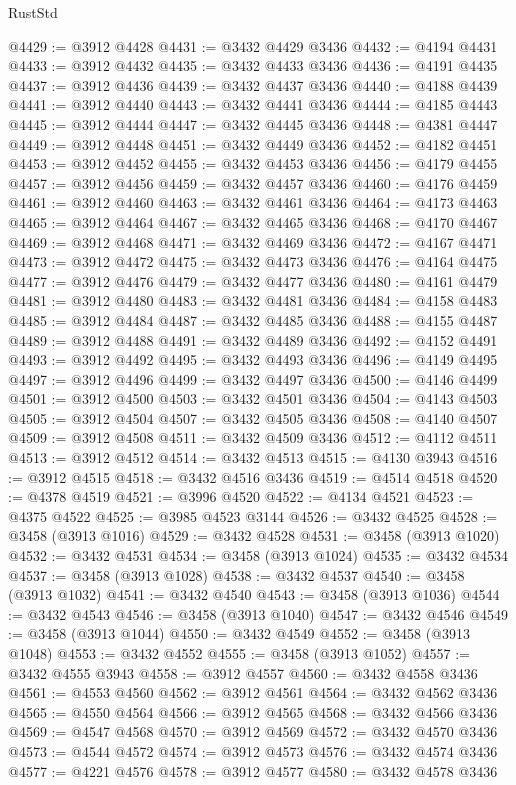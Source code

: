 \begin{lexlean}{RustStd}
\begin{coremodule}
@4429 := @3912 @4428
@4431 := @3432 @4429 @3436
@4432 := @4194 @4431
@4433 := @3912 @4432
@4435 := @3432 @4433 @3436
@4436 := @4191 @4435
@4437 := @3912 @4436
@4439 := @3432 @4437 @3436
@4440 := @4188 @4439
@4441 := @3912 @4440
@4443 := @3432 @4441 @3436
@4444 := @4185 @4443
@4445 := @3912 @4444
@4447 := @3432 @4445 @3436
@4448 := @4381 @4447
@4449 := @3912 @4448
@4451 := @3432 @4449 @3436
@4452 := @4182 @4451
@4453 := @3912 @4452
@4455 := @3432 @4453 @3436
@4456 := @4179 @4455
@4457 := @3912 @4456
@4459 := @3432 @4457 @3436
@4460 := @4176 @4459
@4461 := @3912 @4460
@4463 := @3432 @4461 @3436
@4464 := @4173 @4463
@4465 := @3912 @4464
@4467 := @3432 @4465 @3436
@4468 := @4170 @4467
@4469 := @3912 @4468
@4471 := @3432 @4469 @3436
@4472 := @4167 @4471
@4473 := @3912 @4472
@4475 := @3432 @4473 @3436
@4476 := @4164 @4475
@4477 := @3912 @4476
@4479 := @3432 @4477 @3436
@4480 := @4161 @4479
@4481 := @3912 @4480
@4483 := @3432 @4481 @3436
@4484 := @4158 @4483
@4485 := @3912 @4484
@4487 := @3432 @4485 @3436
@4488 := @4155 @4487
@4489 := @3912 @4488
@4491 := @3432 @4489 @3436
@4492 := @4152 @4491
@4493 := @3912 @4492
@4495 := @3432 @4493 @3436
@4496 := @4149 @4495
@4497 := @3912 @4496
@4499 := @3432 @4497 @3436
@4500 := @4146 @4499
@4501 := @3912 @4500
@4503 := @3432 @4501 @3436
@4504 := @4143 @4503
@4505 := @3912 @4504
@4507 := @3432 @4505 @3436
@4508 := @4140 @4507
@4509 := @3912 @4508
@4511 := @3432 @4509 @3436
@4512 := @4112 @4511
@4513 := @3912 @4512
@4514 := @3432 @4513
@4515 := @4130 @3943
@4516 := @3912 @4515
@4518 := @3432 @4516 @3436
@4519 := @4514 @4518
@4520 := @4378 @4519
@4521 := @3996 @4520
@4522 := @4134 @4521
@4523 := @4375 @4522
@4525 := @3985 @4523 @3144
@4526 := @3432 @4525
@4528 := @3458 (@3913 @1016)
@4529 := @3432 @4528
@4531 := @3458 (@3913 @1020)
@4532 := @3432 @4531
@4534 := @3458 (@3913 @1024)
@4535 := @3432 @4534
@4537 := @3458 (@3913 @1028)
@4538 := @3432 @4537
@4540 := @3458 (@3913 @1032)
@4541 := @3432 @4540
@4543 := @3458 (@3913 @1036)
@4544 := @3432 @4543
@4546 := @3458 (@3913 @1040)
@4547 := @3432 @4546
@4549 := @3458 (@3913 @1044)
@4550 := @3432 @4549
@4552 := @3458 (@3913 @1048)
@4553 := @3432 @4552
@4555 := @3458 (@3913 @1052)
@4557 := @3432 @4555 @3943
@4558 := @3912 @4557
@4560 := @3432 @4558 @3436
@4561 := @4553 @4560
@4562 := @3912 @4561
@4564 := @3432 @4562 @3436
@4565 := @4550 @4564
@4566 := @3912 @4565
@4568 := @3432 @4566 @3436
@4569 := @4547 @4568
@4570 := @3912 @4569
@4572 := @3432 @4570 @3436
@4573 := @4544 @4572
@4574 := @3912 @4573
@4576 := @3432 @4574 @3436
@4577 := @4221 @4576
@4578 := @3912 @4577
@4580 := @3432 @4578 @3436

\end{coremodule}
\end{lexlean}
